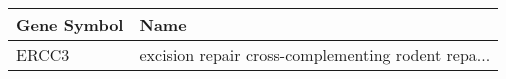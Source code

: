 \begin{tabular}{ll}
\toprule
Gene Symbol &                                               Name \\
\midrule
      ERCC3 & excision repair cross-complementing rodent repa... \\
\bottomrule
\end{tabular}
